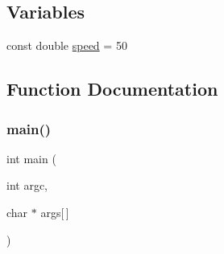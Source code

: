 \subsection*{Variables}
\begin{DoxyCompactItemize}
\item 
const double \mbox{\hyperlink{_library_01_tugas_01_besar_01_o_o_p_01_07_rev_012018-03-29_0110_2main_8cpp_a71fd37308050cd439537c5c6c2cb4614}{speed}} = 50
\end{DoxyCompactItemize}


\subsection{Function Documentation}
\mbox{\label{_library_01_tugas_01_besar_01_o_o_p_01_07_rev_012018-03-29_0110_2main_8cpp_a700a0caa5b70a06d1064e576f9f3cf65}} 
\subsubsection{\texorpdfstring{main()}{main()}}
{\footnotesize\ttfamily int main (\begin{DoxyParamCaption}\item[{int}]{argc,  }\item[{char $\ast$}]{args\mbox{[}$\,$\mbox{]} }\end{DoxyParamCaption})}

